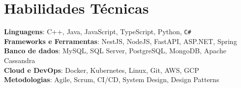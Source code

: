 \documentclass[letterpaper,11pt]{article}
\makeatletter
\newcommand{\resumeItem}[1]{
  \item\small{
    {#1 \vspace{-2pt}}
  }
}
\newcommand{\resumeProjectHeading}[2]{
    \item
    \begin{tabular*}{1.001\textwidth}{l@{\extracolsep{\fill}}r}
      \small#1 & \textbf{\small #2}\\
    \end{tabular*}\vspace{-7pt}
}
\newcommand{\resumeSubHeadingListStart}{\begin{itemize}[leftmargin=0.0in, label={}]}
\newcommand{\resumeSubHeadingListEnd}{\end{itemize}}
\newcommand{\resumeItemListStart}{\begin{itemize}}
\newcommand{\resumeItemListEnd}{\end{itemize}\vspace{-5pt}}
\makeatother
\begin{document}


%
\section{Habilidades Técnicas}
 \begin{itemize}[leftmargin=0.15in, label={}]
    \small{\item{
     \textbf{Linguagens}{: C++, Java, JavaScript, TypeScript, Python, \texttt{C\#}} \\
     \textbf{Frameworks e Ferramentas}{: NestJS, NodeJS, FastAPI, ASP.NET, Spring} \\
     \textbf{Banco de dados}{: MySQL, SQL Server, PostgreSQL, MongoDB, Apache Cassandra} \\
     \textbf{Cloud e DevOps}{: Docker, Kubernetes, Linux, Git, AWS, GCP} \\
     \textbf{Metodologias}{: Agile, Scrum, CI/CD, System Design, Design Patterns} \\
    }} 
 \end{itemize}
 \vspace{-16pt}

%
\end{document}
